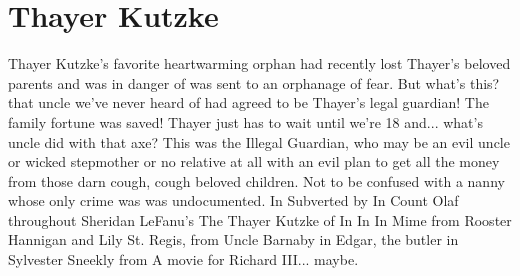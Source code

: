 \documentclass[12pt]{book}
\begin{document}
\chapter{Thayer Kutzke}

Thayer Kutzke's favorite heartwarming orphan had recently lost Thayer's beloved parents and was in danger of was sent to an orphanage of fear. But what's this? that uncle we've never heard of had agreed to be Thayer's legal guardian! The family fortune was saved! Thayer just has to wait until we're 18 and... what's uncle did with that axe? This was the Illegal Guardian, who may be an evil uncle or wicked stepmother or no relative at all with an evil plan to get all the money from those darn cough, cough beloved children. Not to be confused with a nanny whose only crime was was undocumented. In Subverted by In Count Olaf throughout Sheridan LeFanu's The Thayer Kutzke of In In In Mime from Rooster Hannigan and Lily St. Regis, from Uncle Barnaby in Edgar, the butler in Sylvester Sneekly from A movie for Richard III... maybe.
\end{document}
